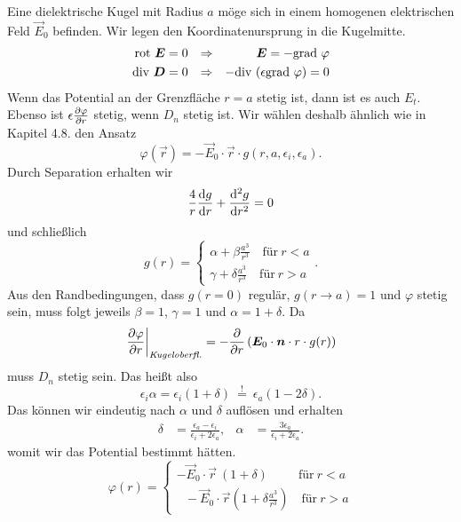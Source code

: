 Eine dielektrische Kugel mit Radius $a$ möge sich in einem homogenen elektrischen Feld $\vec{E}_0$ befinden. Wir legen den Koordinatenursprung in die Kugelmitte. 
\begin{align*}
\text{rot } \bm{E} &=0 &\Rightarrow & &\bm{E}=-\text{grad }\varphi\\
\text{div }\bm{D} &=0 &\Rightarrow& &-\text{div }(\epsilon\text{grad }\varphi)=0
\end{align*}
Wenn das Potential an der Grenzfläche $r=a$ stetig ist, dann ist es auch $E_t$. Ebenso ist $\epsilon\frac{\partial{\varphi}}{\partial{r}}$ stetig, wenn $D_n$ stetig ist. Wir wählen deshalb ähnlich wie in Kapitel 4.8. den Ansatz
\begin{equation*}
\varphi(\vec{r})=-\vec{E}_0\cdot\vec{r}\cdot g(r,a,\epsilon_i,\epsilon_a).
\end{equation*}
Durch Separation erhalten wir
\begin{equation*}
\frac{4}{r}\frac{\mathrm{d}{g}}{\mathrm{d}{r}}+\frac{\mathrm{d}^2{g}}{\mathrm{d}{r}^2}=0
\end{equation*}
und schließlich
\begin{equation*}
g(r)=\left\lbrace\begin{matrix}
\alpha + \beta\frac{a^3}{r^3} \quad\text{für}\ r<a\\
\gamma + \delta\frac{a^3}{r^3}\quad\text{für}\ r>a
\end{matrix}\right. .
\end{equation*}
Aus den Randbedingungen, dass $g(r=0)$ regulär, $g(r\rightarrow a)=1$ und $\varphi$ stetig sein, muss folgt jeweils $\beta=1$, $\gamma=1$ und $\alpha=1+\delta$. Da
\begin{equation*}
\left.\frac{\partial{\varphi}}{\partial{r}}\right|_\textit{Kugeloberfl.} = -\frac{\partial{}}{\partial{r}}\left(\bm{E}_0\cdot\bm{n}\cdot r\cdot g(r)\right)
\end{equation*}
muss $D_n$ stetig sein. Das heißt also
\begin{equation*}
\epsilon_i \alpha = \epsilon_i(1+\delta)\ \stackrel{!}{=}\ \epsilon_a(1-2\delta).
\end{equation*}
Das können wir eindeutig nach $\alpha$ und $\delta$ auflösen und erhalten
\begin{align*}
\delta & = \frac{\epsilon_a-\epsilon_i}{\epsilon_i+2\epsilon_a}, &\alpha&=\frac{3\epsilon_a}{\epsilon_i+2\epsilon_a}.
\end{align*}
womit wir das Potential bestimmt hätten.
\begin{equation*}
\varphi(r)=\left\lbrace\begin{matrix}
-\vec{E}_0\cdot\vec{r}\ (1+\delta) \qquad\ \ \text{für}\ r<a\\
\ \ \ -\vec{E}_0\cdot\vec{r}  (1+\delta\frac{a^3}{r^3})\quad\text{für}\ r>a
\end{matrix}\right. 
\end{equation*}
